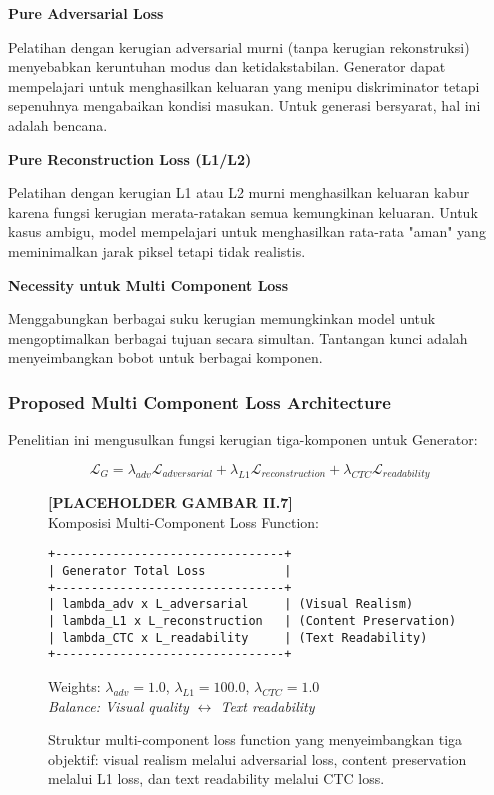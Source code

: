 \documentclass[12pt,a4paper]{article}
\begin{document}
\textbf{Pure Adversarial Loss}

Pelatihan dengan kerugian adversarial murni (tanpa kerugian rekonstruksi) menyebabkan keruntuhan modus dan ketidakstabilan. Generator dapat mempelajari untuk menghasilkan keluaran yang menipu diskriminator tetapi sepenuhnya mengabaikan kondisi masukan. Untuk generasi bersyarat, hal ini adalah bencana.

\textbf{Pure Reconstruction Loss (L1/L2)}

Pelatihan dengan kerugian L1 atau L2 murni menghasilkan keluaran kabur karena fungsi kerugian merata-ratakan semua kemungkinan keluaran. Untuk kasus ambigu, model mempelajari untuk menghasilkan rata-rata "aman" yang meminimalkan jarak piksel tetapi tidak realistis.

\textbf{Necessity untuk Multi Component Loss}

Menggabungkan berbagai suku kerugian memungkinkan model untuk mengoptimalkan berbagai tujuan secara simultan. Tantangan kunci adalah menyeimbangkan bobot untuk berbagai komponen.

\subsubsection{Proposed Multi Component Loss Architecture}
\label{subsubsec:multi-component-loss}

Penelitian ini mengusulkan fungsi kerugian tiga-komponen untuk Generator:

\begin{equation}
\mathcal{L}_G = \lambda_{adv} \mathcal{L}_{adversarial} + \lambda_{L1} \mathcal{L}_{reconstruction} + \lambda_{CTC} \mathcal{L}_{readability}
\end{equation}

\begin{figure}[H]
\centering
\textbf{[PLACEHOLDER GAMBAR II.7]}\\[0.5em]
Komposisi Multi-Component Loss Function:\\[0.3em]
\begin{verbatim}
+--------------------------------+
| Generator Total Loss           |
+--------------------------------+
| lambda_adv x L_adversarial     | (Visual Realism)
| lambda_L1 x L_reconstruction   | (Content Preservation)
| lambda_CTC x L_readability     | (Text Readability)
+--------------------------------+
\end{verbatim}
Weights: $\lambda_{adv}=1.0$, $\lambda_{L1}=100.0$, $\lambda_{CTC}=1.0$\\[0.3em]
\textit{Balance: Visual quality $\leftrightarrow$ Text readability}
\caption{Struktur multi-component loss function yang menyeimbangkan tiga objektif: visual realism melalui adversarial loss, content preservation melalui L1 loss, dan text readability melalui CTC loss.}
\label{fig:multi-component-loss}
\end{figure}
\end{document}
